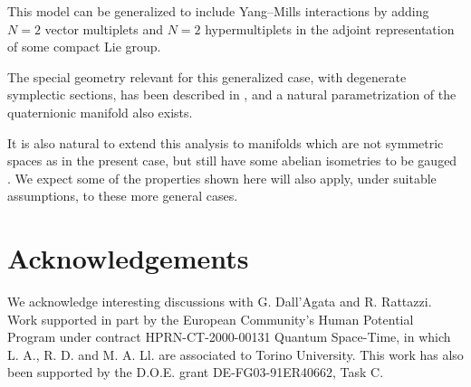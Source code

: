 \documentclass[a4paper,12pt]{article}
\begin{document}
This model can be generalized to include Yang--Mills interactions by adding $N=2$ vector multiplets and $N=2$ hypermultiplets in the
adjoint representation of some compact Lie group.

The special geometry relevant for this generalized case, with degenerate symplectic sections, has been described in \cite{dflv},
and a natural parametrization of the quaternionic manifold also exists.

It is also natural to extend this analysis to manifolds which are not symmetric spaces as in the present case, but 
still have some abelian isometries to be gauged \cite{louis}.
We expect some of the properties shown here will also apply, under suitable assumptions, to these more general cases.


 

\section*{Acknowledgements}
We acknowledge interesting discussions with G. Dall'Agata and R. Rattazzi.
 Work
supported in part by the European Community's Human Potential
Program under contract HPRN-CT-2000-00131 Quantum Space-Time, in
which L. A.,  R. D. and M. A. Ll. are associated to Torino
University. This work has also  been supported by the
D.O.E. grant DE-FG03-91ER40662, Task C.
\end{document}
